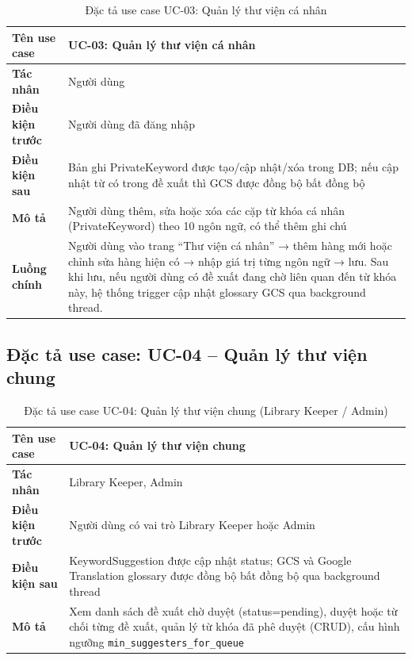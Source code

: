 \begin{table}[H]
\centering
\caption{Đặc tả use case UC-03: Quản lý thư viện cá nhân}
\label{tab:uc03}
\renewcommand{\arraystretch}{1.3}
\begin{tabularx}{\textwidth}{|l|X|}
\hline
\textbf{Tên use case}    & UC-03: Quản lý thư viện cá nhân \\
\hline
\textbf{Tác nhân}        & Người dùng \\
\hline
\textbf{Điều kiện trước} & Người dùng đã đăng nhập \\
\hline
\textbf{Điều kiện sau}   & Bản ghi PrivateKeyword được tạo/cập nhật/xóa trong DB; nếu cập nhật
                           từ có trong đề xuất thì GCS được đồng bộ bất đồng bộ \\
\hline
\textbf{Mô tả}           & Người dùng thêm, sửa hoặc xóa các cặp từ khóa cá nhân (PrivateKeyword)
                           theo 10 ngôn ngữ, có thể thêm ghi chú \\
\hline
\textbf{Luồng chính}     & Người dùng vào trang ``Thư viện cá nhân'' → thêm hàng mới hoặc chỉnh
                           sửa hàng hiện có → nhập giá trị từng ngôn ngữ → lưu.
                           Sau khi lưu, nếu người dùng có đề xuất đang chờ liên quan đến từ
                           khóa này, hệ thống trigger cập nhật glossary GCS qua background thread. \\
\hline
\end{tabularx}
\end{table}

\subsection{Đặc tả use case: UC-04 -- Quản lý thư viện chung}

\begin{table}[H]
\centering
\caption{Đặc tả use case UC-04: Quản lý thư viện chung (Library Keeper / Admin)}
\label{tab:uc04}
\renewcommand{\arraystretch}{1.3}
\begin{tabularx}{\textwidth}{|l|X|}
\hline
\textbf{Tên use case}    & UC-04: Quản lý thư viện chung \\
\hline
\textbf{Tác nhân}        & Library Keeper, Admin \\
\hline
\textbf{Điều kiện trước} & Người dùng có vai trò Library Keeper hoặc Admin \\
\hline
\textbf{Điều kiện sau}   & KeywordSuggestion được cập nhật status; GCS và Google Translation
                           glossary được đồng bộ bất đồng bộ qua background thread \\
\hline
\textbf{Mô tả}           & Xem danh sách đề xuất chờ duyệt (status=pending), duyệt hoặc từ chối
                           từng đề xuất, quản lý từ khóa đã phê duyệt (CRUD), cấu hình ngưỡng
                           \texttt{min\_suggesters\_for\_queue} \\
\hline
\end{tabularx}
\end{table}

